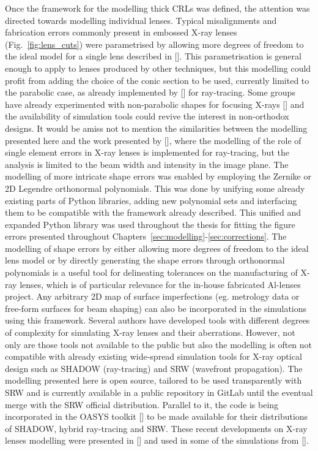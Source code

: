 \begin{refsection}
Once the framework for the modelling thick CRLs was defined, the attention was directed towards modelling individual lenses. Typical misalignments and fabrication errors commonly present in embossed X-ray lenses (Fig.~\ref{fig:lens_cuts}) were parametrised by allowing more degrees of freedom to the ideal model for a single lens described in [\cite{Baltser2011}]. This parametrisation is general enough to apply to lenses produced by other techniques, but this modelling could profit from adding the choice of the conic section to be used, currently limited to the parabolic case, as already implemented by [\cite{SanchezdelRio2012,Andrejczuk2010}] for ray-tracing. Some groups have already experimented with non-parabolic shapes for focusing X-rays [\cite{Alianelli2007,Evans-Lutterodt2003, Alianelli2015, Sutter2017}] and the availability of simulation tools could revive the interest in non-orthodox designs. It would be amiss not to mention the similarities between the modelling presented here and the work presented by [\cite{Andrejczuk2010}], where the modelling of the role of single element errors in X-ray lenses is implemented for ray-tracing, but the analysis is limited to the beam width and intensity in the image plane. The modelling of more intricate shape errors was enabled by employing the Zernike or 2D Legendre orthonormal polynomials. This was done by unifying some already existing parts of Python libraries, adding new polynomial sets and interfacing them to be compatible with the framework already described. This unified and expanded Python library was used throughout the thesis for fitting the figure errors presented throughout Chapters~\ref{sec:modelling}-\ref{sec:corrections}. The modelling of shape errors by either allowing more degrees of freedom to the ideal lens model or by directly generating the shape errors through orthonormal polynomials is a useful tool for delineating tolerances on the manufacturing of X-ray lenses, which is of particular relevance for the in-house fabricated Al-lenses project. Any arbitrary 2D map of surface imperfections (eg. metrology data or free-form surfaces for beam shaping) can also be incorporated in the simulations using this framework. Several authors have developed tools with different degrees of complexity for simulating X-ray lenses and their aberrations. However, not only are those tools not available to the public but also the modelling is often not compatible with already existing wide-spread simulation tools for X-ray optical design such as SHADOW (ray-tracing) and SRW (wavefront propagation). The modelling presented here is open source, tailored to be used transparently with SRW and is currently available in a public repository in GitLab until the eventual merge with the SRW official distribution. Parallel to it, the code is being incorporated in the OASYS toolkit [\cite{Rebuffi2017}] to be made available for their distributions of SHADOW, hybrid ray-tracing and SRW. These recent developments on X-ray lenses modelling were presented in [\cite{Celestre2020b}] and used in some of the simulations from [\cite{Chubar2020}].


\end{refsection}

